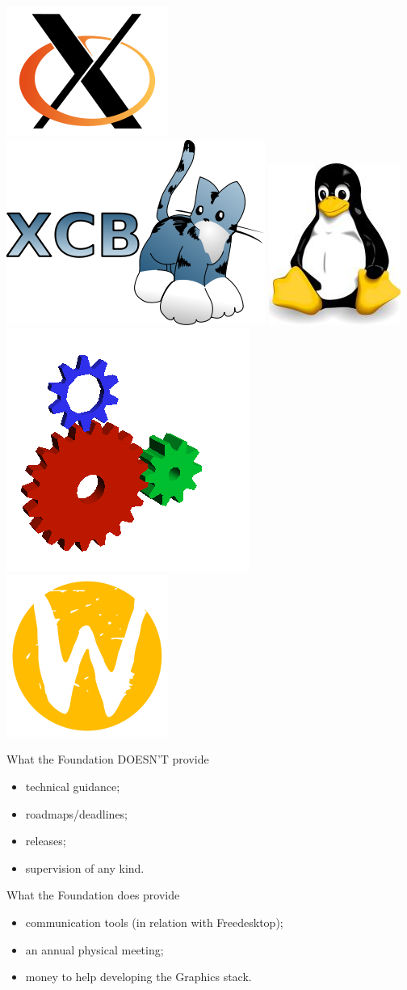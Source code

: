 \documentclass{beamer}
\begin{document}
\begin{frame}
			\begin{center}
				\includegraphics[width=.15\linewidth]{figures/logo_small_200px.png}
				\hspace{.05\linewidth}
				\includegraphics[width=.15\linewidth]{figures/xcb_logo_small.png}
				\hspace{.05\linewidth}
				\includegraphics[width=.15\linewidth]{figures/tux_small.jpg}
				\hspace{.05\linewidth}
				\includegraphics[width=.15\linewidth]{figures/glxgears-trans.png}
				\hspace{.05\linewidth}
				\includegraphics[width=.15\linewidth]{figures/wayland_logo_small.png}
			\end{center}

		\end{frame}

		\begin{frame}
			\begin{block}{What the Foundation DOESN'T provide}
				\begin{itemize}
					\item technical guidance;
					\item roadmaps/deadlines;
					\item releases;
					\item supervision of any kind.
				\end{itemize}
			\end{block}
			
			\begin{block}{What the Foundation does provide}
				\begin{itemize}
					\item communication tools (in relation with Freedesktop);
					\item an annual physical meeting;
					\item money to help developing the Graphics stack.
				\end{itemize}
			\end{block}
		\end{frame}
\end{document}
